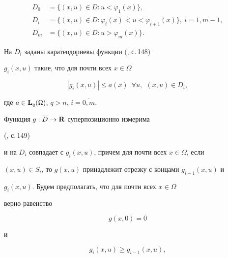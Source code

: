 \begin{align*}


D_0&=\{(x, u)\in D : u<\varphi_1(x)\},\\


D_i&=\{(x, u)\in D : \varphi_i(x)<u<\varphi_{i+1}(x)\},\ i=\overline{1, m-1},\\


D_m&=\{(x, u)\in D : u>\varphi_m(x)\}.


\end{align*}





На $\overline{D_i}$ заданы каратеодориевы функции (\cite{kar}, с.\,148)


$g_i(x, u)$ такие, что для почти всех $x\in\Omega$


\begin{equation}


\label{odin}


|g_i(x, u)|\leq a(x) \ \; \forall u,\ \ (x,u)\in\overline{D_i},


\end{equation}


где $a\in {\bold L}_q(\Omega)$, $q>n$, $i=\overline{0, m}$.





Функция $g: \overline{D}\rightarrow {\bold R}$ суперпозиционно измерима


(\cite{kar}, с.\,149)


и на $D_i$ совпадает с $g_i(x, u)$, причем для почти всех $x\in\Omega$, если


$(x, u)\in S_i$, то $g(x, u)$ принадлежит отрезку с концами $g_{i-1}(x, u)$ и


$g_i(x, u)$. Будем предполагать, что для почти всех $x\in\Omega$


верно равенство


\begin{equation}


\label{dva}


g(x, 0)=0


\end{equation}


и


\begin{equation}


\label{n3}


g_i(x, u)\geq g_{i-1}(x, u),


\end{equation}


